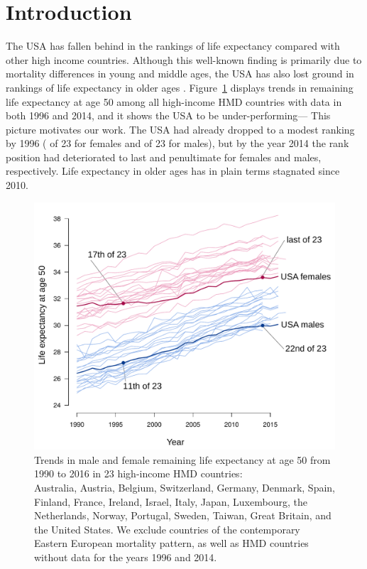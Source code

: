 \section{Introduction}
The USA has fallen behind in the rankings of life expectancy compared with other high income countries. Although this well-known finding is primarily due to mortality differences in young and middle ages, the USA has also lost ground in rankings of life expectancy in older ages \citep{HMD}. Figure~\ref{fig:uslose} displays trends in remaining life expectancy at age 50 among all high-income HMD countries with data in both 1996 and 2014, and it shows the USA to be under-performing--- This picture motivates our work. The USA had already dropped to a modest ranking by 1996 ( of 23 for females and  of 23 for males), but by the year 2014 the rank position had deteriorated to last and penultimate for females and males, respectively. Life expectancy in older ages has in plain terms stagnated since 2010. 

\begin{figure}[ht!]
\centering
\includegraphics[scale=.7]{Figures/USAvsOthers_Ink.pdf}
\caption{Trends in male and female remaining life expectancy at age 50 from 1990 to 2016 in 23 high-income HMD countries:  \\ \footnotesize Australia, Austria, Belgium, Switzerland, Germany, Denmark, Spain, Finland, France, Ireland, Israel, Italy, Japan, Luxembourg, the Netherlands, Norway, Portugal, Sweden, Taiwan, Great Britain, and the United States. We exclude countries of the contemporary Eastern European mortality pattern, as well as HMD countries without data for the years 1996 and 2014.}
\label{fig:uslose}
\end{figure}

